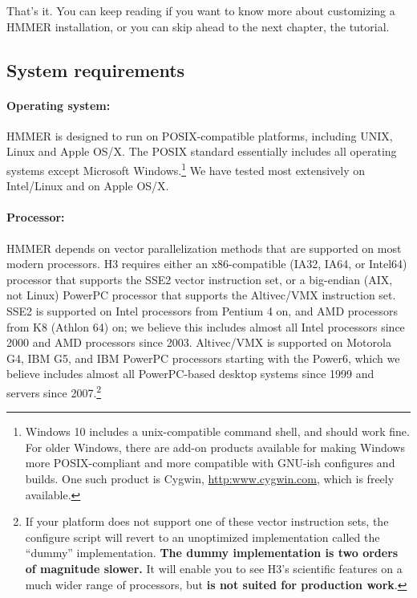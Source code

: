 
That's it.  You can keep reading if you want to know more about
customizing a HMMER installation, or you can skip ahead to the next
chapter, the tutorial.

\subsection{System requirements}

\paragraph{Operating system:} HMMER is designed to run on
POSIX-compatible platforms, including UNIX, Linux and Apple OS/X. The
POSIX standard essentially includes all operating systems except
Microsoft Windows.\footnote{Windows 10 includes a unix-compatible
  command shell, and should work fine. For older Windows, there are
  add-on products available for making Windows more POSIX-compliant
  and more compatible with GNU-ish configures and builds. One such
  product is Cygwin, \url{http:www.cygwin.com}, which is freely
  available.}  We have tested most extensively on Intel/Linux and on
Apple OS/X.


\paragraph{Processor:} HMMER depends on vector parallelization methods
that are supported on most modern processors. H3 requires either an
x86-compatible (IA32, IA64, or Intel64) processor that supports the
SSE2 vector instruction set, or a big-endian (AIX, not Linux) PowerPC
processor that supports the Altivec/VMX instruction set. SSE2 is
supported on Intel processors from Pentium 4 on, and AMD processors
from K8 (Athlon 64) on; we believe this includes almost all Intel
processors since 2000 and AMD processors since 2003. Altivec/VMX is
supported on Motorola G4, IBM G5, and IBM PowerPC processors starting
with the Power6, which we believe includes almost all PowerPC-based
desktop systems since 1999 and servers since 2007.\footnote{
If your platform does not support one of these vector instruction
sets, the configure script will revert to an unoptimized
implementation called the ``dummy'' implementation. \textbf{The dummy
  implementation is two orders of magnitude slower.} It will enable
you to see H3's scientific features on a much wider range of
processors, but \textbf{is not suited for production work}.}


